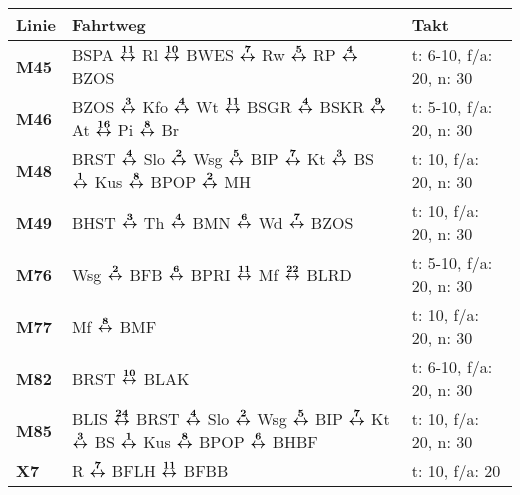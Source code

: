 \begin{minipage}[t]{0.05\textwidth}
\phantom{Tor}
\end{minipage}
\begin{minipage}[t]{0.45\textwidth}
\begin{tabular}{>{\bfseries}L{1.2cm}L{9.0cm}L{3.0cm}}
{\bfseries Linie} & {\bfseries Fahrtweg} & {\bfseries Takt} \\
\hline
\mbus{} M45   & BSPA $\xarwe{11}$ Rl $\xarwe{10}$ BWES $\xarwe{7}$ Rw $\xarwe{5}$ RP $\xarwe{4}$ BZOS                                                                               & t: 6-10, f/a: 20, n: 30    \\
\mbus{} M46   & BZOS $\xarwe{3}$ Kfo $\xarwe{4}$ Wt $\xarwe{11}$ BSGR $\xarwe{4}$ BSKR $\xarwe{9}$ At $\xarwe{16}$ Pi $\xarwe{8}$ Br                                                & t: 5-10, f/a: 20, n: 30    \\
\mbus{} M48   & BRST $\xarwe{4}$ Slo $\xarwe{2}$ Wsg $\xarwe{5}$ BIP $\xarwe{7}$ Kt $\xarwe{3}$ BS $\xarwe{1}$ Kus $\xarwe{8}$ BPOP $\xarwe{2}$ MH                                  & t: 10, f/a: 20, n: 30      \\
\mbus{} M49   & BHST $\xarwe{3}$ Th $\xarwe{4}$ BMN $\xarwe{6}$ Wd $\xarwe{7}$ BZOS                                                                                                 & t: 10, f/a: 20, n: 30      \\
\mbus{} M76   & Wsg $\xarwe{2}$ BFB $\xarwe{6}$ BPRI $\xarwe{11}$ Mf $\xarwe{22}$ BLRD                                                                                              & t: 5-10, f/a: 20, n: 30    \\
\mbus{} M77   & Mf $\xarwe{8}$ BMF                                                                                                                                                  & t: 10, f/a: 20, n: 30      \\
\mbus{} M82   & BRST $\xarwe{10}$ BLAK                                                                                                                                              & t: 6-10, f/a: 20, n: 30    \\
\mbus{} M85   & BLIS $\xarwe{24}$ BRST $\xarwe{4}$ Slo $\xarwe{2}$ Wsg $\xarwe{5}$ BIP $\xarwe{7}$ Kt $\xarwe{3}$ BS $\xarwe{1}$ Kus $\xarwe{8}$ BPOP $\xarwe{6}$ BHBF              & t: 10, f/a: 20, n: 30      \\
\xbus{} X7    & R $\xarwe{7}$ BFLH $\xarwe{11}$ BFBB                                                                                                                                                    & t: 10, f/a: 20             \\

\end{tabular}
\end{minipage}
